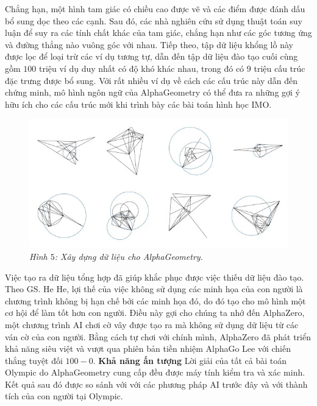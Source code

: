 \begin{multicols}{2}
	\vskip 0.1cm
	Chẳng hạn, một hình tam giác có chiều cao được vẽ và các điểm được đánh dấu bổ sung dọc theo các cạnh. Sau đó, các nhà nghiên cứu sử dụng thuật toán suy luận để suy ra các tính chất khác của tam giác, chẳng hạn như các góc tương ứng và đường thẳng nào vuông góc với nhau. 
	\vskip 0.1cm
	Tiếp theo, tập dữ liệu khổng lồ này được lọc để loại trừ các ví dụ tương tự, dẫn đến tập dữ liệu đào tạo cuối cùng gồm $100$ triệu ví dụ duy nhất có độ khó khác nhau, trong đó có $9$ triệu cấu trúc đặc trưng được bổ sung. Với rất nhiều ví dụ về cách các cấu trúc này dẫn đến chứng minh, mô hình ngôn ngữ của AlphaGeometry có thể đưa ra những gợi ý hữu ích cho các cấu trúc mới khi trình bày các bài toán hình học IMO.
	\begin{figure}[H]
		\vspace*{-5pt}
		\centering
		\captionsetup{labelformat= empty, justification=centering}
		\includegraphics[width= 1\linewidth]{data_generated.jpg}
		\caption{\small\textit{\color{timhieukhoahoc}Hình $5$: Xây dựng dữ liệu cho AlphaGeometry.}}
		\vspace*{-10pt}
	\end{figure}
	Việc tạo ra dữ liệu tổng hợp đã giúp khắc phục được việc thiếu dữ liệu đào tạo. Theo GS. He He, lợi thế của việc không sử dụng các minh họa của con người là chương trình không bị hạn chế bởi các minh họa đó, do đó tạo cho mô hình một cơ hội để làm tốt hơn con người. Điều này gợi cho chúng ta nhớ đến AlphaZero, một chương trình AI chơi cờ vây được tạo ra mà không sử dụng dữ liệu từ các ván cờ của con người. Bằng cách tự chơi với chính mình, AlphaZero đã phát triển khả năng siêu việt và vượt qua phiên bản tiền nhiệm AlphaGo Lee với chiến thắng tuyệt đối $100 - 0$.
	\vskip 0.1cm
	\textbf{\color{timhieukhoahoc}Khả năng ấn tượng} 
	\vskip 0.1cm
	Lời giải của tất cả bài toán Olympic do AlphaGeometry cung cấp đều được máy tính kiểm tra và xác minh. Kết quả sau đó được so sánh với với các phương pháp AI trước đây và với thành tích của con người tại Olympic.

\end{multicols}
